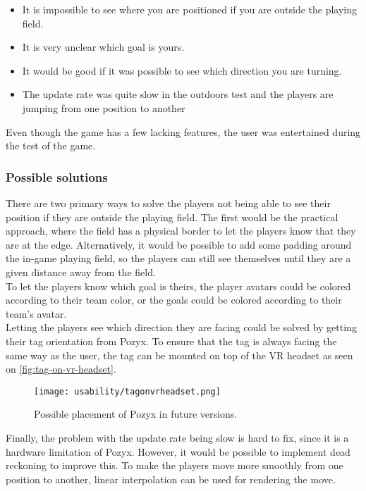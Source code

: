 \begin{itemize}
    \item It is impossible to see where you are positioned if you are outside the playing field.
    \item It is very unclear which goal is yours.
    \item It would be good if it was possible to see which direction you are turning.
    \item The update rate was quite slow in the outdoors test and the players are jumping from one position to another
\end{itemize}
Even though the game has a few lacking features, the user was entertained during the test of the game.

\subsubsection{Possible solutions}
There are two primary ways to solve the players not being able to see their position if they are outside the playing field.
The first would be the practical approach, where the field has a physical border to let the players know that they are at the edge.
Alternatively, it would be possible to add some padding around the in-game playing field, so the players can still see themselves until they are a given distance away from the field.
\\
To let the players know which goal is theirs, the player avatars could be colored according to their team color, or the goals could be colored according to their team's avatar.
\\
Letting the players see which direction they are facing could be solved by getting their tag orientation from Pozyx.
To ensure that the tag is always facing the same way as the user, the tag can be mounted on top of the VR headset as seen on \autoref{fig:tag-on-vr-headset}.

\begin{figure}[H]
    \centering
    \texttt{[image: usability/tagonvrheadset.png]}
    \caption{Possible placement of Pozyx in future versions.}
    \label{fig:tag-on-vr-headset}
\end{figure}
\noindent
Finally, the problem with the update rate being slow is hard to fix, since it is a hardware limitation of Pozyx. However, it would be possible to implement dead reckoning to improve this.
To make the players move more smoothly from one position to another, linear interpolation can be used for rendering the move.
